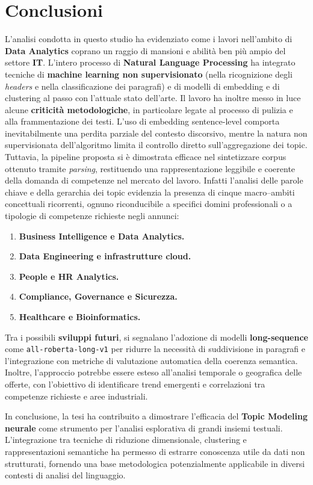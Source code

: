 \chapter{Conclusioni}
L'analisi condotta in questo studio ha evidenziato come i lavori nell'ambito di \textbf{Data Analytics} coprano un raggio di mansioni e abilità ben più ampio del settore \textbf{IT}.
L'intero processo di \textbf{Natural Language Processing} ha integrato tecniche di \textbf{machine learning non supervisionato} (nella ricognizione degli \textit{headers} e nella classificazione dei paragrafi) e di modelli di embedding e di clustering al passo con l'attuale stato dell'arte.
Il lavoro ha inoltre messo in luce alcune \textbf{criticità metodologiche}, in particolare legate al processo di pulizia e alla frammentazione dei testi. L’uso di embedding sentence-level comporta inevitabilmente una perdita parziale del contesto discorsivo, mentre la natura non supervisionata dell’algoritmo limita il controllo diretto sull’aggregazione dei topic. Tuttavia, la pipeline proposta si è dimostrata efficace nel sintetizzare corpus ottenuto tramite \textit{parsing}, restituendo una rappresentazione leggibile e coerente della domanda di competenze nel mercato del lavoro.
Infatti l’analisi delle parole chiave e della gerarchia dei topic evidenzia
la presenza di cinque macro–ambiti concettuali ricorrenti,
ognuno riconducibile a specifici domini professionali
o a tipologie di competenze richieste negli annunci:
\begin{enumerate}
    \item \textbf{Business Intelligence e Data Analytics.}
    \item \textbf{Data Engineering e infrastrutture cloud.}
    \item \textbf{People e HR Analytics.}
    \item \textbf{Compliance, Governance e Sicurezza.}
    \item \textbf{Healthcare e Bioinformatics.}
\end{enumerate}
Tra i possibili \textbf{sviluppi futuri}, si segnalano l’adozione di modelli \textbf{long-sequence} come \texttt{all-roberta-long-v1} per ridurre la necessità di suddivisione in paragrafi e l’integrazione con metriche di valutazione automatica della coerenza semantica. Inoltre, l’approccio potrebbe essere esteso all’analisi temporale o geografica delle offerte, con l’obiettivo di identificare trend emergenti e correlazioni tra competenze richieste e aree industriali.

In conclusione, la tesi ha contribuito a dimostrare l’efficacia del \textbf{Topic Modeling neurale} come strumento per l’analisi esplorativa di grandi insiemi testuali. L’integrazione tra tecniche di riduzione dimensionale, clustering e rappresentazioni semantiche ha permesso di estrarre conoscenza utile da dati non strutturati, fornendo una base metodologica potenzialmente applicabile in diversi contesti di analisi del linguaggio.